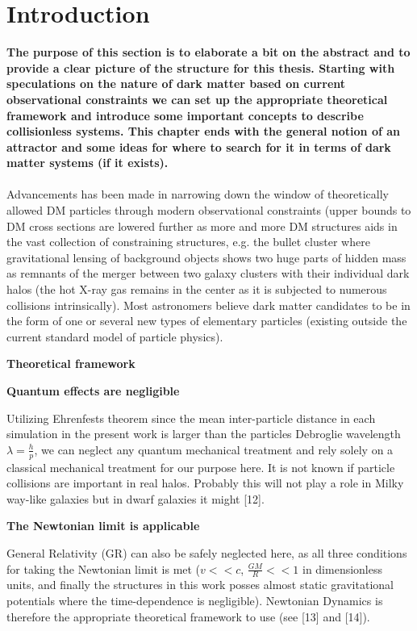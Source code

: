 \section{Introduction}
\textbf{The purpose of this section is to elaborate a bit on the abstract and to provide a clear picture of the structure for this thesis. Starting with speculations on the nature of dark matter based on current observational constraints we can set up the appropriate theoretical framework and introduce some important concepts to describe collisionless systems. This chapter ends with the general notion of an attractor and some ideas for where to search for it in terms of dark matter systems (if it exists).} \\ \\

Advancements has been made in narrowing down the window of theoretically allowed DM particles through modern observational constraints (upper bounds to DM cross sections are lowered further as more and more DM structures aids in the vast collection of constraining structures, e.g. the bullet cluster where gravitational lensing of background objects shows two huge parts of hidden mass as remnants of the merger between two galaxy clusters with their individual dark halos (the hot X-ray gas remains in the center as it is subjected to numerous collisions intrinsically). Most astronomers believe dark matter candidates to be in the form of one or several new types of elementary particles (existing outside the current standard model of particle physics).

\centerline{\textbf{Theoretical framework}} 

\centerline{\textbf{Quantum effects are negligible}} 
Utilizing Ehrenfests theorem since the mean inter-particle distance in each simulation in the present work is larger than the particles Debroglie wavelength $\lambda = \frac{h}{p}$, we can neglect any quantum mechanical treatment and rely solely on a classical mechanical treatment for our purpose here. 
It is not known if particle collisions are important in real halos. 
Probably this will not play a role in Milky way-like galaxies but in dwarf galaxies it might [12].

\centerline{\textbf{The Newtonian limit is applicable}} 
General Relativity (GR) can also be safely neglected here, as all three conditions for taking the Newtonian limit is met ($v<<c$, $\frac{GM}{R}<<1$ in dimensionless units, and finally the structures in this work posses almost static gravitational potentials where the time-dependence is negligible). Newtonian Dynamics is therefore the appropriate theoretical framework to use (see [13] and [14]). \\

